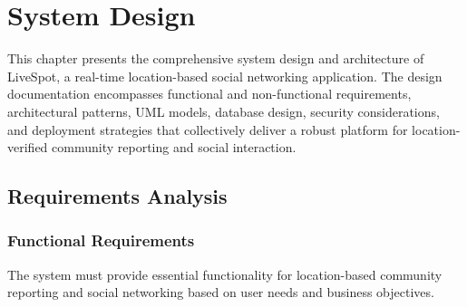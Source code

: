 \chapter{System Design}
\label{ch:system_design}

This chapter presents the comprehensive system design and architecture of LiveSpot, a real-time location-based social networking application. The design documentation encompasses functional and non-functional requirements, architectural patterns, UML models, database design, security considerations, and deployment strategies that collectively deliver a robust platform for location-verified community reporting and social interaction.

\section{Requirements Analysis}
\label{sec:requirements_analysis}

\subsection{Functional Requirements}

The system must provide essential functionality for location-based community reporting and social networking based on user needs and business objectives.

